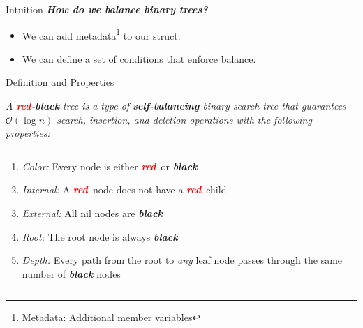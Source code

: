 \documentclass[aspectratio=169]{beamer}
\newcommand{\textib}[1]{\textit{\textbf{{#1}}}}
\newcommand{\red}{\textib{\textcolor{red}{red}}}
\newcommand{\define}[1]{\begin{tcolorbox}[title={Definition}]\small{\textit{{#1}}}\end{tcolorbox}}
\begin{document}
\begin{frame}{Intuition}
    \textib{How do we balance binary trees?} \vspace{1em}

    \begin{itemize}[label=$\to$]
        \item<3-> We can add metadata\footnote{Metadata: Additional member variables} to our 
             struct.
        \item<4-> We can define a set of conditions that enforce balance.
    \end{itemize}
\end{frame}


\begin{frame}[label=def,fragile]{Definition and Properties}
    \define {
        A \red\textib{-black} tree is a type of \textib{self-balancing} binary 
        search tree that guarantees $\mathcal{O}(\log n)$ search, insertion, and deletion operations
        with the following properties:
    }
    \begin{columns}
        \begin{column}{.5\textwidth}
            \begin{adjustbox}{valign=T, minipage=[t]{\textwidth}}
                \begin{enumerate}[label=\textit{(\roman*)}]
                    \item<1> \textit{Color:} Every node is either \red \ or \textib{black}
                    \item<2> \textit{Internal:} A \red \ node does not have a \red \ child
                    \item<3> \textit{External:} All nil nodes are \textib{black}
                    \item<4> \textit{Root:} The root node is always \textib{black}
                    \item<5> \textit{Depth:} Every path from the root to \textit{any} leaf node 
                        passes through the same number of \textib{black} nodes
                \end{enumerate}
            \end{adjustbox}
        \end{column}

        \begin{column}{.5\textwidth}
        \end{column}
    \end{columns}
\end{frame}
\end{document}
